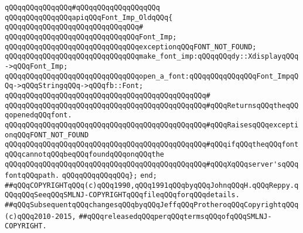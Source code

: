 \verb|qQQqqQQqqQQqqQQq#qQQqqQQqqQQqqQQqqQQq|\newline
\newline
\verb|qQQqqQQqqQQqqQQqapiqQQqFont_Imp_OldqQQq{|\newline
\verb|qQQqqQQqqQQqqQQqqQQqqQQqqQQqqQQq#|\newline
\verb|qQQqqQQqqQQqqQQqqQQqqQQqqQQqqQQqFont_Imp;|\newline
\newline
\verb|qQQqqQQqqQQqqQQqqQQqqQQqqQQqqQQqexceptionqQQqFONT_NOT_FOUND;|\newline
\newline
\verb|qQQqqQQqqQQqqQQqqQQqqQQqqQQqqQQqmake_font_imp:qQQqqQQqdy::XdisplayqQQq->qQQqFont_Imp;|\newline
\newline
\verb|qQQqqQQqqQQqqQQqqQQqqQQqqQQqqQQqopen_a_font:qQQqqQQqqQQqqQQqFont_ImpqQQq->qQQqStringqQQq->qQQqfb::Font;|\newline
\verb|qQQqqQQqqQQqqQQqqQQqqQQqqQQqqQQqqQQqqQQqqQQqqQQq#|\newline
\verb|qQQqqQQqqQQqqQQqqQQqqQQqqQQqqQQqqQQqqQQqqQQqqQQq#qQQqReturnsqQQqtheqQQqopenedqQQqfont.|\newline
\verb|qQQqqQQqqQQqqQQqqQQqqQQqqQQqqQQqqQQqqQQqqQQqqQQq#qQQqRaisesqQQqexceptionqQQqFONT_NOT_FOUND|\newline
\verb|qQQqqQQqqQQqqQQqqQQqqQQqqQQqqQQqqQQqqQQqqQQqqQQq#qQQqifqQQqtheqQQqfontqQQqcannotqQQqbeqQQqfoundqQQqonqQQqthe|\newline
\verb|qQQqqQQqqQQqqQQqqQQqqQQqqQQqqQQqqQQqqQQqqQQqqQQq#qQQqXqQQqserver'sqQQqfontqQQqpath.|\newline
\verb|qQQqqQQqqQQqqQQq};|\newline
\newline
\verb|end;|\newline
\newline
\verb|##qQQqCOPYRIGHTqQQq(c)qQQq1990,qQQq1991qQQqbyqQQqJohnqQQqH.qQQqReppy.qQQqqQQqSeeqQQqSMLNJ-COPYRIGHTqQQqfileqQQqforqQQqdetails.|\newline
\verb|##qQQqSubsequentqQQqchangesqQQqbyqQQqJeffqQQqProtheroqQQqCopyrightqQQq(c)qQQq2010-2015,|\newline
\verb|##qQQqreleasedqQQqperqQQqtermsqQQqofqQQqSMLNJ-COPYRIGHT.|\newline

